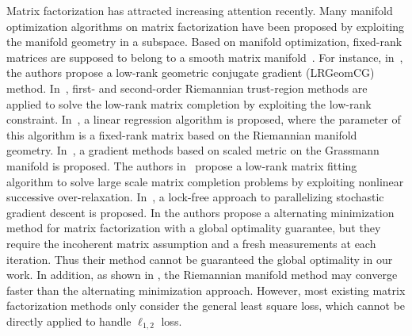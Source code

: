 \documentclass[letterpaper]{article} %
\begin{document}
Matrix factorization has attracted increasing attention recently.
Many manifold optimization algorithms on matrix factorization have been proposed by exploiting the manifold geometry in a subspace.
Based on manifold optimization, fixed-rank matrices are supposed to belong to a smooth matrix manifold~\cite{vandereycken2013lowrank,rtrmc2011boumal,Bonnabel2011,ngonips2012scaled}.
For instance, in~\cite{vandereycken2013lowrank}, the authors propose a low-rank geometric conjugate gradient (LRGeomCG) method.
In~\cite{rtrmc2011boumal}, first- and second-order Riemannian trust-region methods are applied to solve the low-rank matrix completion by exploiting the low-rank constraint.
In~\cite{Bonnabel2011}, a linear regression algorithm is proposed, where the parameter of this algorithm is a fixed-rank matrix based on the Riemannian manifold geometry.
In~\cite{ngonips2012scaled}, a gradient methods based on scaled metric on the Grassmann manifold is proposed.
The authors in~\cite{Wen2012} propose a low-rank matrix fitting algorithm to solve large scale matrix completion problems by exploiting nonlinear successive over-relaxation.
In~\cite{RechtNIPS2011hogwild}, a lock-free approach to parallelizing stochastic gradient descent is proposed.
In \cite{jain2013low} the authors propose a alternating minimization method for matrix factorization with a global optimality guarantee,
but they require the incoherent matrix assumption and a fresh measurements at each iteration.
Thus their method cannot be guaranteed the global optimality in our work.
In addition, as shown in \cite{vandereycken2013lowrank}, the Riemannian manifold method may converge faster than the alternating minimization approach.
However, most existing matrix factorization methods only consider the general least square loss, which cannot be directly applied to handle $\ell_{1,2}$ loss.
\end{document}
